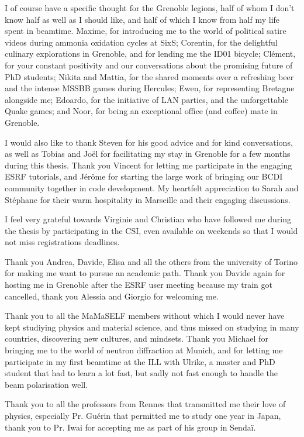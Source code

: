 I of course have a specific thought for the Grenoble legions, half of whom I don't know half as well as I should like, and half of which I know from half my life spent in beamtime.
Maxime, for introducing me to the world of political satire videos during ammonia oxidation cycles at SixS; Corentin, for the delightful culinary explorations in Grenoble, and for lending me the ID01 bicycle; Clément, for your constant positivity and our conversations about the promising future of PhD students; Nikita and Mattia, for the shared moments over a refreshing beer and the intense MSSBB games during Hercules; Ewen, for representing Bretagne alongside me; Edoardo, for the initiative of LAN parties, and the unforgettable Quake games; and Noor, for being an exceptional office (and coffee) mate in Grenoble.

I would also like to thank Steven for his good advice and for kind conversations, as well as Tobias and Joël for facilitating my stay in Grenoble for a few months during this thesis.
Thank you Vincent for letting me participate in the engaging ESRF tutorials, and Jérôme for starting the large work of bringing our BCDI community together in code development.
My heartfelt appreciation to Sarah and Stéphane for their warm hospitality in Marseille and their engaging discussions.

I feel very grateful towards Virginie and Christian who have followed me during the thesis by participating in the CSI, even available on weekends so that I would not miss registrations deadlines.

Thank you Andrea, Davide, Elisa and all the others from the university of Torino for making me want to pursue an academic path.
Thank you Davide again for hosting me in Grenoble after the ESRF user meeting because my train got cancelled, thank you Alessia and Giorgio for welcoming me.

Thank you to all the MaMaSELF members without which I would never have kept studiying physics and material science, and thus missed on studying in many countries, discovering new cultures, and mindsets.
Thank you Michael for bringing me to the world of neutron diffraction at Munich, and for letting me participate in my first beamtime at the ILL with Ulrike, a master and PhD student that had to learn a lot fast, but sadly not fast enough to handle the beam polarisation well.

Thank you to all the professors from Rennes that transmitted me their love of physics, especially Pr. Guérin that permitted me to study one year in Japan, thank you to Pr. Iwai for accepting me as part of his group in Sendaï.

